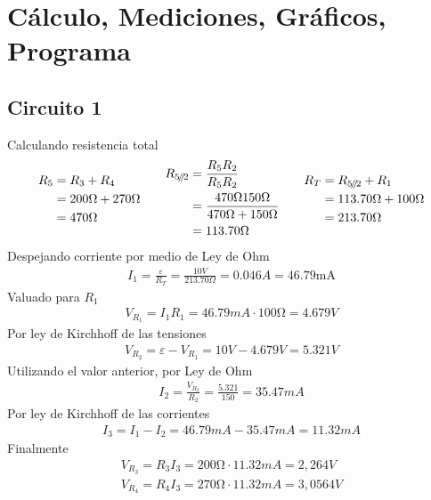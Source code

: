 \documentclass[12pt,a4paper,oneside]{article}
\newcommand{\parallelsum}{\mathbin{\!/\mkern-5mu/\!}}
\begin{document}
\section{Cálculo, Mediciones, Gráficos, Programa}
\subsection{Circuito 1}
Calculando resistencia total
\begin{align}
  \begin{aligned}
R_{5} &= R_{3} + R_{4} \\
        &= 200\unit{\ohm} + 270\unit{\ohm} \\
        &= 470\unit{\ohm} \\
\end{aligned}
\quad\quad
\begin{aligned}
  R_{5\parallelsum 2}  &= \frac{R_{5}R_{2}}{R_{5}R_{2}} \\ 
                       &= \frac{470\unit{\ohm}150\unit{\ohm}}{470\unit{\ohm}+150\unit{\ohm}} \\ 
                       &=113.70\unit{\ohm}
\end{aligned}
\quad\quad 
\begin{aligned}
  R_{T} &= R_{5\parallelsum 2} + R_{1} \\ 
        &=113.70 \unit{\ohm} + 100 \unit{\ohm} \\
        &= 213.70 \unit{\ohm}
\end{aligned}
\end{align}
Despejando corriente por medio de Ley de Ohm
\begin{align}
  I_{1} = \frac{\varepsilon}{R_{T}} = \frac{10V}{213.70\Omega} = 0.046A = 46.79\unit{\milli\ampere}
\end{align}
Valuado para $R_{1}$
\begin{align}
  V_{R_{1}} = I_{1} R_{1} = 46.79mA \cdot 100\unit{\ohm} = 4.679V 
\end{align}
Por ley de Kirchhoff de las tensiones
\begin{align}
  V_{R_{2}} = \varepsilon - V_{R_{1}} = 10V-4.679V = 5.321V 
\end{align}
Utilizando el valor anterior, por Ley de Ohm
\begin{align}
  I_{2} = \frac{V_{R_{2}}}{R_{2}} = \frac{5.321}{150} = 35.47mA 
\end{align}
Por ley de Kirchhoff de las corrientes
\begin{align}
  I_{3} = I_{1}-I_{2} = 46.79mA - 35.47mA = 11.32mA 
\end{align}
Finalmente
\begin{align}
  V_{R_{3}} = R_{3} I_{3} = 200\unit{\ohm} \cdot 11.32mA  = 2,264V  \\
  V_{R_{4}} = R_{4} I_{3} = 270\unit{\ohm} \cdot 11.32mA  = 3,0564V 
\end{align}
\end{document}
